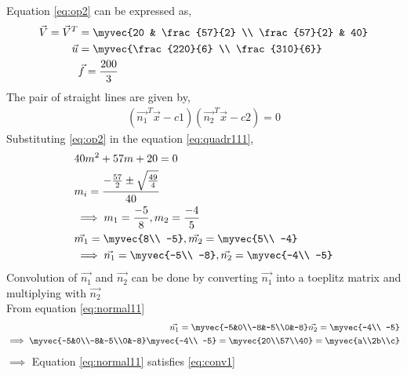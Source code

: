 Equation \eqref{eq:op2} can be expressed as,
\begin{align}
\vec{V}=\vec{V}^T&=\myvec{20 & \frac{57}{2} \\ \frac{57}{2} & 40} \label{eq:eq1vec1}\\
\vec{u}&=\myvec{\frac{220}{6} \\ \frac{310}{6}} \label{eq:eq2vec1}\\
&\vec{f}=\frac{200}{3}
\end{align}
The pair of straight lines are given by,
\begin{align}
    (\vec{n_1}^{T}\vec{x} - c1)(\vec{n_2}^{T}\vec{x} - c2)=0\label{eq:maineq2}
\end{align}
Substituting \eqref{eq:op2} in the equation \eqref{eq:quadr111},
\begin{align}
    &40m^2+57m+20=0 \label{eq:quadr11}\\
    &m_i=\frac{-\frac{57}{2}\pm{\sqrt{\frac{49}{4}}}}{40}\\
    &\implies m_1 = \frac{-5}{8} , m_2 = \frac{-4}{5}\\
    & \vec{m_1}=\myvec{8\\ -5}, \vec{m_2}=\myvec{5\\ -4}\\
    &\implies \vec{n_1}=\myvec{-5\\ -8}, \vec{n_2}=\myvec{-4\\ -5} \label{eq:normal11}
\end{align}
Convolution of $\vec{n_1}$ and $\vec{n_2}$ can be done by converting $\vec{n_1}$ into a toeplitz matrix and multiplying with $\vec{n_2}$\\
From equation \eqref{eq:normal11}
\begin{align}
    \vec{n_1}=\myvec{-5&0\\-8&-5\\0&-8}
    \vec{n_2}=\myvec{-4\\ -5}\label{eq:conv21}\\
\implies \myvec{-5&0\\-8&-5\\0&-8}\myvec{-4\\ -5} = \myvec{20\\57\\40} = \myvec{a\\2b\\c}\label{eq:conv31}
\end{align}
$\implies$ Equation \eqref{eq:normal11} satisfies \eqref{eq:conv1}\\

